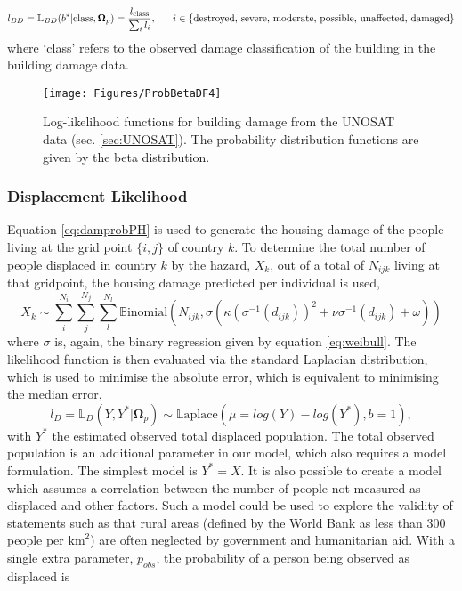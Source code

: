 \documentclass[10pt,a4paper]{article}
\begin{document}
\begin{multicols}{1}
\begin{equation}
  l_{BD}=\mathbb{L}_{BD}(b^*|\text{class},\boldsymbol{\Omega}_p)=\frac{l_{\text{\text{class}}}}{\sum_i l_i}, \;\;\;\;\;\; i\in \{\text{destroyed, severe, moderate, possible, unaffected, damaged}\}
\end{equation}
where `class' refers to the observed damage classification of the building in the building damage data.
\begin{figure}[H]
   \texttt{[image: Figures/ProbBetaDF4]}
 	\caption{Log-likelihood functions for building damage from the UNOSAT data (sec. \ref{sec:UNOSAT}). The probability distribution functions are given by the beta distribution.}
 	\label{fig:LLbeta}
\end{figure}
\subsubsection{Displacement Likelihood}\label{sec:dispLL}
Equation \ref{eq:damprobPH} is used to generate the housing damage of the people living at the grid point $\{i,j\}$ of country $k$. To determine the total number of people displaced in country $k$ by the hazard, $X_{k}$, out of a total of $N_{ijk}$ living at that gridpoint, the housing damage predicted per individual is used,
\begin{equation}\label{eq:bindisp}
  X_{k}\sim\sum_i^{N_i}\sum_j^{N_j}\sum_l^{N_l}\mathbb{B}\text{inomial}\left(N_{ijk},\sigma\left(\kappa(\sigma^{-1}(d_{ijk}))^2 + \nu\sigma^{-1}(d_{ijk})+\omega\right)\right)
\end{equation}
where $\sigma$ is, again, the binary regression given by equation \ref{eq:weibull}. The likelihood function is then evaluated via the standard Laplacian distribution, which is used to minimise the absolute error, which is equivalent to minimising the median error,
\begin{equation}\label{eq:LLD}
  l_D=\mathbb{L}_{D}(Y,Y^*|\boldsymbol{\Omega}_p)\sim \mathbb{L}\text{aplace}(\mu = log(Y)-log(Y^*), b=1),
\end{equation}
with $Y^*$ the estimated observed total displaced population. The total observed population is an additional parameter in our model, which also requires a model formulation. The simplest model is $Y^*=X$. It is also possible to create a model which assumes a correlation between the number of people not measured as displaced and other factors. Such a model could be used to explore the validity of statements such as that rural areas (defined by the World Bank as less than 300 people per $\text{km}^2$) are often neglected by government and humanitarian aid. With a single extra parameter, $p_{obs}$, the probability of a person being observed as displaced is

\end{multicols}
\end{document}
